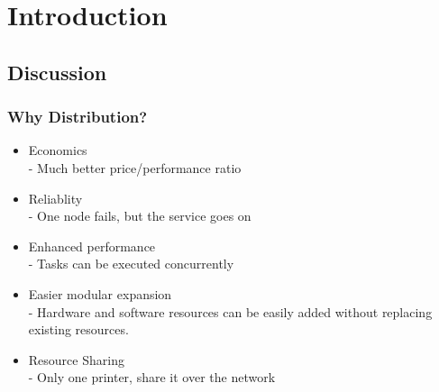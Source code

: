 \section{Introduction}

\subsection{Discussion}

\begin{frame}
    \frametitle{Why Distribution?}
    \begin{itemize}
        \item Economics \\
            - Much better price/performance ratio
        \item Reliablity \\
            - One node fails, but the service goes on
        \item Enhanced performance \\
            - Tasks can be executed concurrently
        \item Easier modular expansion \\
            - Hardware and software resources can be easily added without replacing existing resources.
        \item Resource Sharing \\
            - Only one printer, share it over the network
    \end{itemize}
\end{frame}
